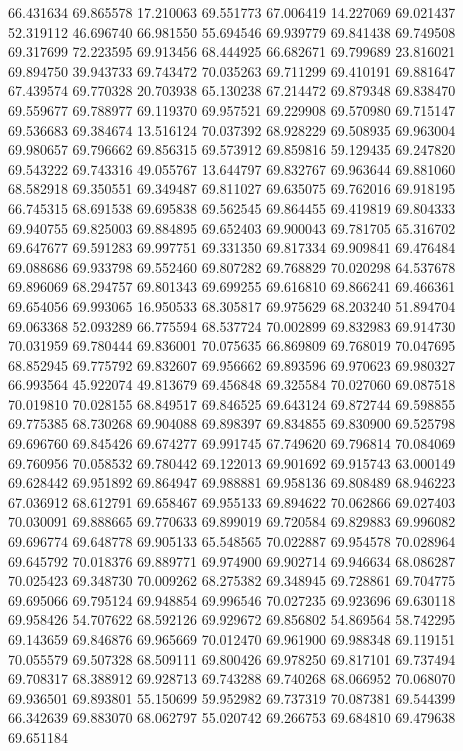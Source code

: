66.431634
69.865578
17.210063
69.551773
67.006419
14.227069
69.021437
52.319112
46.696740
66.981550
55.694546
69.939779
69.841438
69.749508
69.317699
72.223595
69.913456
68.444925
66.682671
69.799689
23.816021
69.894750
39.943733
69.743472
70.035263
69.711299
69.410191
69.881647
67.439574
69.770328
20.703938
65.130238
67.214472
69.879348
69.838470
69.559677
69.788977
69.119370
69.957521
69.229908
69.570980
69.715147
69.536683
69.384674
13.516124
70.037392
68.928229
69.508935
69.963004
69.980657
69.796662
69.856315
69.573912
69.859816
59.129435
69.247820
69.543222
69.743316
49.055767
13.644797
69.832767
69.963644
69.881060
68.582918
69.350551
69.349487
69.811027
69.635075
69.762016
69.918195
66.745315
68.691538
69.695838
69.562545
69.864455
69.419819
69.804333
69.940755
69.825003
69.884895
69.652403
69.900043
69.781705
65.316702
69.647677
69.591283
69.997751
69.331350
69.817334
69.909841
69.476484
69.088686
69.933798
69.552460
69.807282
69.768829
70.020298
64.537678
69.896069
68.294757
69.801343
69.699255
69.616810
69.866241
69.466361
69.654056
69.993065
16.950533
68.305817
69.975629
68.203240
51.894704
69.063368
52.093289
66.775594
68.537724
70.002899
69.832983
69.914730
70.031959
69.780444
69.836001
70.075635
66.869809
69.768019
70.047695
68.852945
69.775792
69.832607
69.956662
69.893596
69.970623
69.980327
66.993564
45.922074
49.813679
69.456848
69.325584
70.027060
69.087518
70.019810
70.028155
68.849517
69.846525
69.643124
69.872744
69.598855
69.775385
68.730268
69.904088
69.898397
69.834855
69.830900
69.525798
69.696760
69.845426
69.674277
69.991745
67.749620
69.796814
70.084069
69.760956
70.058532
69.780442
69.122013
69.901692
69.915743
63.000149
69.628442
69.951892
69.864947
69.988881
69.958136
69.808489
68.946223
67.036912
68.612791
69.658467
69.955133
69.894622
70.062866
69.027403
70.030091
69.888665
69.770633
69.899019
69.720584
69.829883
69.996082
69.696774
69.648778
69.905133
65.548565
70.022887
69.954578
70.028964
69.645792
70.018376
69.889771
69.974900
69.902714
69.946634
68.086287
70.025423
69.348730
70.009262
68.275382
69.348945
69.728861
69.704775
69.695066
69.795124
69.948854
69.996546
70.027235
69.923696
69.630118
69.958426
54.707622
68.592126
69.929672
69.856802
54.869564
58.742295
69.143659
69.846876
69.965669
70.012470
69.961900
69.988348
69.119151
70.055579
69.507328
68.509111
69.800426
69.978250
69.817101
69.737494
69.708317
68.388912
69.928713
69.743288
69.740268
68.066952
70.068070
69.936501
69.893801
55.150699
59.952982
69.737319
70.087381
69.544399
66.342639
69.883070
68.062797
55.020742
69.266753
69.684810
69.479638
69.651184
